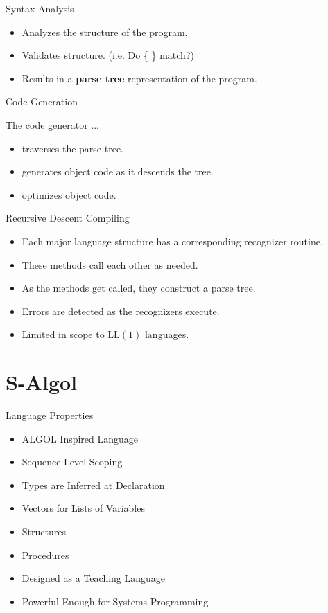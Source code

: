 \documentclass{beamer}
\begin{document}
\begin{frame}{Syntax Analysis}
    \begin{itemize}[<+->]
        \item Analyzes the structure of the program.
        \item Validates structure.  (i.e. Do \{ \} match?)
        \item Results in a {\bf parse tree} representation of the program.
    \end{itemize}
\end{frame}

\begin{frame}{Code Generation}

    The code generator ...
    \begin{itemize}[<+->]
        \item traverses the parse tree.
        \item generates object code as it descends the tree.
        \item optimizes object code.
    \end{itemize}
\end{frame}

\begin{frame}{Recursive Descent Compiling}
    \begin{itemize}[<+->]
        \item Each major language structure has a corresponding recognizer routine.
        \item These methods call each other as needed.
        \item As the methods get called, they construct a parse tree.
        \item Errors are detected as the recognizers execute.
        \item Limited in scope to $\mathrm{LL}(1)$ languages.
    \end{itemize}
\end{frame}

\section{S-Algol}

\begin{frame}{Language Properties}
    \begin{itemize}[<+->]
        \item ALGOL Inspired Language
        \item Sequence Level Scoping
        \item Types are Inferred at Declaration
        \item Vectors for Lists of Variables
        \item Structures
        \item Procedures
        \item Designed as a Teaching Language
        \item Powerful Enough for Systems Programming
    \end{itemize}
\end{frame}
\end{document}
